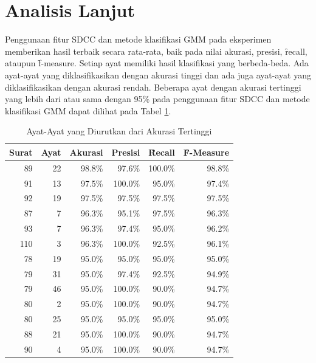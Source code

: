 \section{Analisis Lanjut}

Penggunaan fitur SDCC dan metode klasifikasi GMM pada eksperimen memberikan hasil terbaik secara rata-rata, baik pada nilai akurasi, presisi, \f{recall}, ataupun \f{f-measure}. Setiap ayat memiliki hasil klasifikasi yang berbeda-beda. Ada ayat-ayat yang diklasifikasikan dengan akurasi tinggi dan ada juga ayat-ayat yang diklasifikasikan dengan akurasi rendah. Beberapa ayat dengan akurasi tertinggi yang lebih dari atau sama dengan 95\% pada penggunaan fitur SDCC dan metode klasifikasi GMM dapat dilihat pada Tabel \ref{table:akurasitinggi}.

\begin{table}
  \centering
  \caption{Ayat-Ayat yang Diurutkan dari Akurasi Tertinggi}
  \label{table:akurasitinggi}
  \begin{tabular}{|r|r|r|r|r|r|}
  \hline
  Surat & Ayat & Akurasi & Presisi & \f{Recall}  & \f{F-Measure} \\ \hline
  89  & 22 & 98.8\% & 97.6\%  & 100.0\% & 98.8\% \\ \hline
  91  & 13 & 97.5\% & 100.0\% & 95.0\%  & 97.4\% \\ \hline
  92  & 19 & 97.5\% & 97.5\%  & 97.5\%  & 97.5\% \\ \hline
  87  & 7  & 96.3\% & 95.1\%  & 97.5\%  & 96.3\% \\ \hline
  93  & 7  & 96.3\% & 97.4\%  & 95.0\%  & 96.2\% \\ \hline
  110 & 3  & 96.3\% & 100.0\% & 92.5\%  & 96.1\% \\ \hline
  78  & 19 & 95.0\% & 95.0\%  & 95.0\%  & 95.0\% \\ \hline
  79  & 31 & 95.0\% & 97.4\%  & 92.5\%  & 94.9\% \\ \hline
  79  & 46 & 95.0\% & 100.0\% & 90.0\%  & 94.7\% \\ \hline
  80  & 2  & 95.0\% & 100.0\% & 90.0\%  & 94.7\% \\ \hline
  80  & 25 & 95.0\% & 95.0\%  & 95.0\%  & 95.0\% \\ \hline
  88  & 21 & 95.0\% & 100.0\% & 90.0\%  & 94.7\% \\ \hline
  90  & 4  & 95.0\% & 100.0\% & 90.0\%  & 94.7\% \\ \hline
  \end{tabular}
\end{table}



